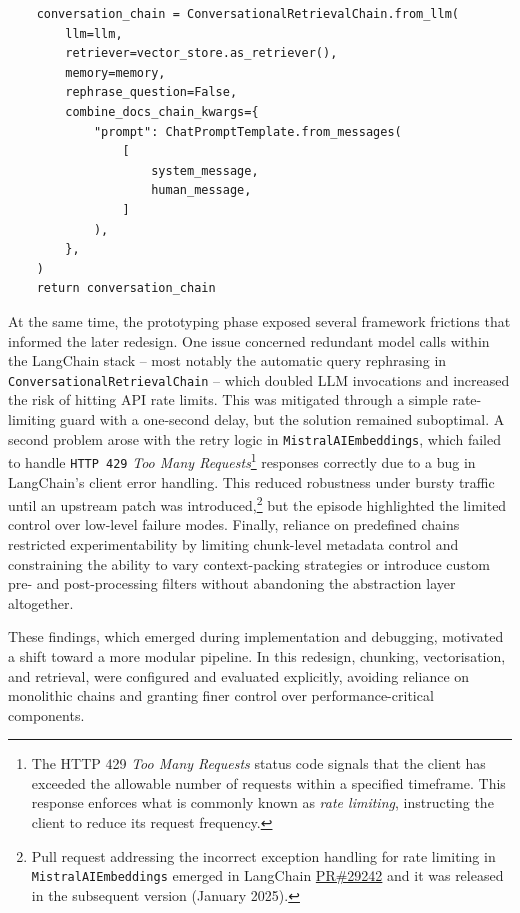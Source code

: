 \begin{spacing}{1.5}
\begin{lstlisting}
    conversation_chain = ConversationalRetrievalChain.from_llm(
        llm=llm,
        retriever=vector_store.as_retriever(),
        memory=memory,
        rephrase_question=False,
        combine_docs_chain_kwargs={
            "prompt": ChatPromptTemplate.from_messages(
                [
                    system_message,
                    human_message,
                ]
            ),
        },
    )
    return conversation_chain
\end{lstlisting}



At the same time, the prototyping phase exposed several framework frictions that informed the later redesign. One issue concerned redundant model calls within the LangChain stack -- most notably the automatic query rephrasing in \texttt{ConversationalRetrievalChain} -- which doubled LLM invocations and increased the risk of hitting API rate limits. This was mitigated through a simple rate-limiting guard with a one-second delay, but the solution remained suboptimal. A second problem arose with the retry logic in \texttt{MistralAIEmbeddings}, which failed to handle \texttt{HTTP 429} \textit{Too Many Requests}\footnote{The HTTP 429 \textit{Too Many Requests} status code signals that the client has exceeded the allowable number of requests within a specified timeframe. This response enforces what is commonly known as \textit{rate limiting}, instructing the client to reduce its request frequency.} responses correctly due to a bug in LangChain’s client error handling. This reduced robustness under bursty traffic until an upstream patch was introduced,\footnote{Pull request addressing the incorrect exception handling for rate limiting in \texttt{MistralAIEmbeddings} emerged in LangChain \href{https://web.archive.org/web/20250823161804/https://github.com/langchain-ai/langchain/pull/29242}{PR\#29242} and it was released in the subsequent version (January 2025).}\nocite{noauthor_mistralai_2025} but the episode highlighted the limited control over low-level failure modes. Finally, reliance on predefined chains restricted experimentability by limiting chunk-level metadata control and constraining the ability to vary context-packing strategies or introduce custom pre- and post-processing filters without abandoning the abstraction layer altogether.

These findings, which emerged during implementation and debugging, motivated a shift toward a more modular pipeline. In this redesign, chunking, vectorisation, and retrieval, were configured and evaluated explicitly, avoiding reliance on monolithic chains and granting finer control over performance-critical components.


\end{spacing}
